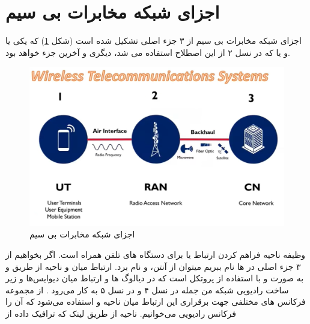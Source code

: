 \documentclass[landscape, 12pt]{report}
\begin{document}
\chapter*{اجزای شبکه مخابرات بی سیم}
اجزای شبکه مخابرات بی سیم از ۳ جزء اصلی تشکیل شده است (شکل \ref{fig:Wireless_Telecommunications_Systems}) که یکی
   یا
   و یا
     که در نسل ۲ از این اصطلاح استفاده می شد، دیگری
        و آخرین جزء
          خواهد بود.
          
          
\begin{figure}[ht]
	\centering
	\includegraphics[width=.6\linewidth]{Pic/Wireless_Telecommunications_Systems}
	\caption{اجزای شبکه مخابرات بی سیم}
	\label{fig:Wireless_Telecommunications_Systems}
\end{figure}
وظیفه ناحیه
  فراهم کردن ارتباط یا
    برای دستگاه های تلفن همراه است. اگر بخواهیم از ۳ جزء اصلی در
      ها نام ببریم میتوان از آنتن،
        و
          نام برد. ارتباط میان
             و ناحیه
               از طریق
                و به صورت
                   و با استفاده از پروتکل
                     است که در دیالوگ ها و ارتباط میان دیوایس‌ها و زیر ساخت رادیویی شبکه من جمله
                       در نسل ۴ و
                         در نسل ۵ به کار می‌رود . از مجموعه فرکانس های مختلفی جهت برقراری این ارتباط میان ناحیه
                           و
                             استفاده می‌شود که آن را فرکانس رادیویی می‌خوانیم. ناحیه
                               از طریق لینک
                                که ترافیک داده از
\end{document}
